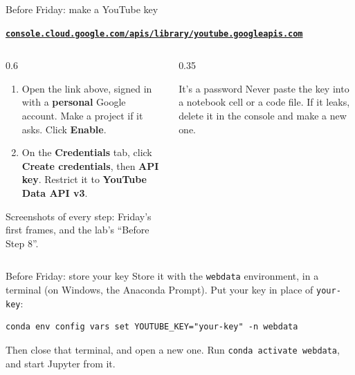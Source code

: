 \documentclass[9pt,aspectratio=169]{beamer}
\begin{document}
\begin{frame}{Before Friday: make a YouTube key}
    \begin{center}
        \small\textbf{\href{https://console.cloud.google.com/apis/library/youtube.googleapis.com}{\texttt{console.cloud.google.com/apis/library/youtube.googleapis.com}}}
    \end{center}
    \begin{columns}[T]
        \begin{column}{0.6\textwidth}
            \begin{enumerate}\small
                \item Open the link above, signed in with a \textbf{personal} Google account. Make a project if it asks. Click \textbf{Enable}.
                \item On the \textbf{Credentials} tab, click \textbf{Create credentials}, then \textbf{API key}. Restrict it to \textbf{YouTube Data API v3}.
            \end{enumerate}
            {\footnotesize Screenshots of every step: Friday's first frames, and the lab's ``Before Step 8''.\par}
        \end{column}
        \begin{column}{0.35\textwidth}
            \begin{alertblock}{It's a password}
                \footnotesize Never paste the key into a notebook cell or a code file. If it leaks, delete it in the console and make a new one.
            \end{alertblock}
        \end{column}
    \end{columns}
\end{frame}

\begin{frame}[fragile]{Before Friday: store your key}
    Store it with the \texttt{webdata} environment, in a terminal (on Windows, the Anaconda Prompt). Put your key in place of \texttt{your-key}:

    \medskip
\begin{lstlisting}
conda env config vars set YOUTUBE_KEY="your-key" -n webdata
\end{lstlisting}

    \medskip
    Then close that terminal, and open a new one. Run \texttt{conda activate webdata}, and start Jupyter from it.
\end{frame}
\end{document}
